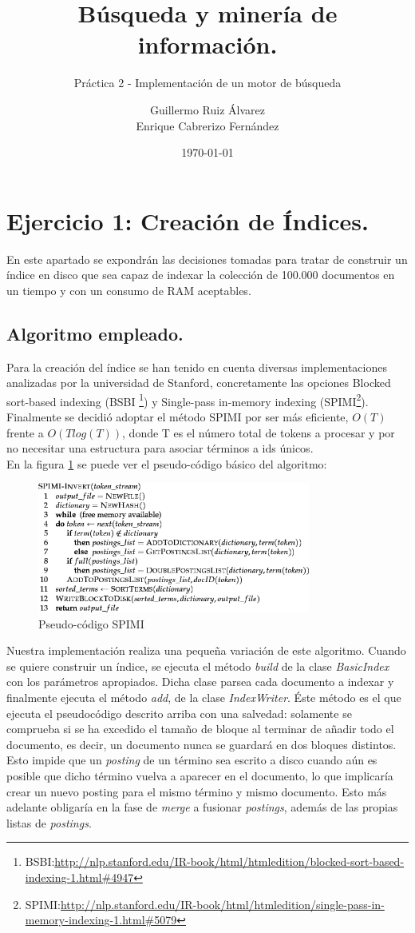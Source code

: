 \documentclass[spanish]{assignment}
\title{Búsqueda y minería de información.}
\subtitle{Práctica 2 - Implementación de un motor de búsqueda}
\author{Guillermo Ruiz Álvarez\\ Enrique Cabrerizo Fernández}
\date{\today}
\begin{document}
	\makepre
	\section{Ejercicio 1: Creación de Índices.}
	En este apartado se expondrán las decisiones tomadas para tratar de construir un índice en disco
	que sea capaz de indexar la colección de 100.000 documentos en un tiempo y con un consumo de RAM aceptables.
	
	\subsection{Algoritmo empleado.}
	Para la creación del índice se han tenido en cuenta diversas implementaciones analizadas por la universidad de Stanford, concretamente las opciones Blocked sort-based indexing (BSBI \footnote{BSBI:\url{http://nlp.stanford.edu/IR-book/html/htmledition/blocked-sort-based-indexing-1.html\#4947}})
	y Single-pass in-memory indexing (SPIMI\footnote{SPIMI:\url{http://nlp.stanford.edu/IR-book/html/htmledition/single-pass-in-memory-indexing-1.html\#5079}}).
	Finalmente se decidió adoptar el método SPIMI por ser más eficiente, $O(T)$ frente a $O(Tlog(T))$, donde T es el número total de tokens a procesar y por no necesitar una estructura para asociar términos a ids únicos.
	\\
	En la figura \ref{fig:spimi_pseudo} se puede ver el pseudo-c\'odigo b\'asico del algoritmo:
	\begin{figure}[h]
		\centering
		\includegraphics[width=0.8\textwidth]{SPIMI.png}
		\caption{Pseudo-c\'odigo SPIMI}
		\label{fig:spimi_pseudo}
	\end{figure}
	
	Nuestra implementación realiza una pequeña variaci\'on de este algoritmo.
	Cuando se quiere construir un \'indice, se ejecuta el m\'etodo \textit{build} de la clase \textit{BasicIndex} con los par\'ametros apropiados. Dicha clase parsea cada documento a indexar y finalmente ejecuta el método \textit{add}, de la clase \textit{IndexWriter}. Éste método es el que ejecuta el pseudocódigo descrito arriba con una salvedad: solamente se comprueba si se ha excedido el tamaño de bloque al terminar de añadir todo el documento, es decir, un documento nunca se guardará en dos bloques distintos. Esto impide que un \textit{posting} de un término sea escrito a disco cuando aún es posible que dicho t\'ermino vuelva a aparecer en el documento, lo que implicaría crear un nuevo posting para el mismo término y mismo documento. Esto más adelante obligaría en la fase de \textit{merge} a fusionar \textit{postings}, además de las propias listas de \textit{postings}.
	
\end{document}
